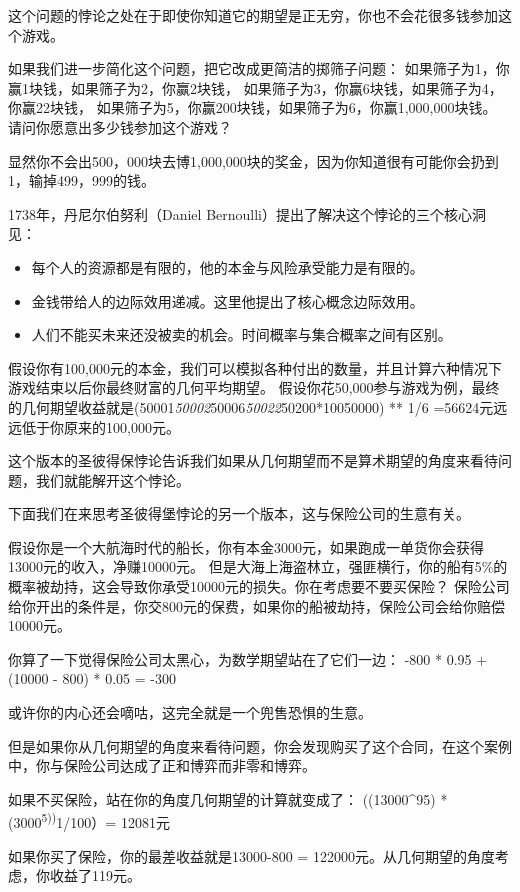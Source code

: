 \documentclass[
  oneside]{book}
\providecommand{\tightlist}{%
  \setlength{\itemsep}{0pt}\setlength{\parskip}{0pt}}
\begin{document}
这个问题的悖论之处在于即使你知道它的期望是正无穷，你也不会花很多钱参加这个游戏。

如果我们进一步简化这个问题，把它改成更简洁的掷筛子问题：
如果筛子为1，你赢1块钱，如果筛子为2，你赢2块钱，
如果筛子为3，你赢6块钱，如果筛子为4，你赢22块钱，
如果筛子为5，你赢200块钱，如果筛子为6，你赢1,000,000块钱。
请问你愿意出多少钱参加这个游戏？

显然你不会出500，000块去博1,000,000块的奖金，因为你知道很有可能你会扔到1，输掉499，999的钱。

1738年，丹尼尔伯努利（Daniel Bernoulli）提出了解决这个悖论的三个核心洞见：

\begin{itemize}
\tightlist
\item
  每个人的资源都是有限的，他的本金与风险承受能力是有限的。
\item
  金钱带给人的边际效用递减。这里他提出了核心概念边际效用。
\item
  人们不能买未来还没被卖的机会。时间概率与集合概率之间有区别。
\end{itemize}

假设你有100,000元的本金，我们可以模拟各种付出的数量，并且计算六种情况下游戏结束以后你最终财富的几何平均期望。
假设你花50,000参与游戏为例，最终的几何期望收益就是(50001\emph{50002}50006\emph{50022}50200*10050000) ** 1/6 =56624元远远低于你原来的100,000元。

这个版本的圣彼得保悖论告诉我们如果从几何期望而不是算术期望的角度来看待问题，我们就能解开这个悖论。

下面我们在来思考圣彼得堡悖论的另一个版本，这与保险公司的生意有关。

假设你是一个大航海时代的船长，你有本金3000元，如果跑成一单货你会获得13000元的收入，净赚10000元。
但是大海上海盗林立，强匪横行，你的船有5\%的概率被劫持，这会导致你承受10000元的损失。你在考虑要不要买保险？
保险公司给你开出的条件是，你交800元的保费，如果你的船被劫持，保险公司会给你赔偿10000元。

你算了一下觉得保险公司太黑心，为数学期望站在了它们一边：
-800 * 0.95 + (10000 - 800) * 0.05 = -300

或许你的内心还会嘀咕，这完全就是一个兜售恐惧的生意。

但是如果你从几何期望的角度来看待问题，你会发现购买了这个合同，在这个案例中，你与保险公司达成了正和博弈而非零和博弈。

如果不买保险，站在你的角度几何期望的计算就变成了：
((13000\^{}95) * (3000\textsuperscript{5))}1/100）= 12081元

如果你买了保险，你的最差收益就是13000-800 = 122000元。从几何期望的角度考虑，你收益了119元。
\end{document}
